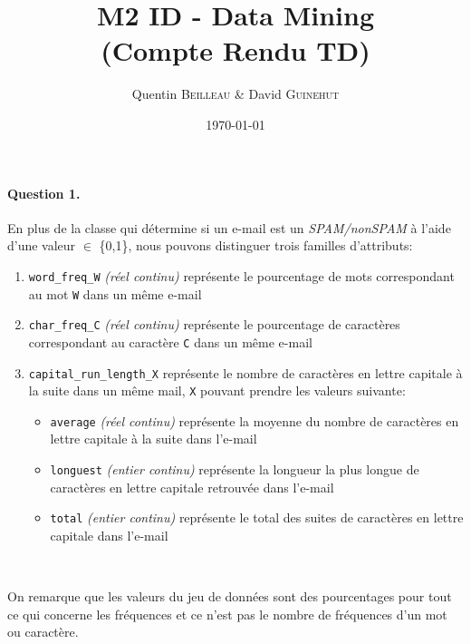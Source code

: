 \documentclass[a4paper,11pt]{article}
\title{M2 ID - Data Mining \\ \normalsize (Compte Rendu TD)}
\author{Quentin \textsc{Beilleau} \& David \textsc{Guinehut}}
\date{\today}
\begin{document}
	\renewcommand{\headrulewidth}{0.001pt}
	
	\pagestyle{fancy}
	
	\maketitle


\paragraph{Question 1.} En plus de la classe qui détermine si un e-mail est un \emph{SPAM/nonSPAM} à l'aide d'une valeur $\in$ \{0,1\}, nous pouvons distinguer trois familles d'attributs:

\begin{enumerate}
	\item \texttt{word\_freq\_W} \emph{(réel continu)} représente le pourcentage de mots correspondant au mot \texttt{W} dans un même e-mail
	\item \texttt{char\_freq\_C} \emph{(réel continu)} représente le pourcentage de caractères correspondant au caractère \texttt{C} dans un même e-mail
	\item \texttt{capital\_run\_length\_X} représente le nombre de caractères en lettre capitale à la suite dans un même mail, \texttt{X} pouvant prendre les valeurs suivante:
	\begin{itemize}
		\item \texttt{average} \emph{(réel continu)} représente la moyenne du nombre de caractères en lettre capitale à la suite dans l'e-mail
		\item \texttt{longuest} \emph{(entier continu)} représente la longueur la plus longue de caractères en lettre capitale retrouvée dans l'e-mail
		\item \texttt{total} \emph{(entier continu)} représente le total des suites de caractères en lettre capitale dans l'e-mail
	\end{itemize}
	~
\end{enumerate}

	On remarque que les valeurs du jeu de données sont des pourcentages pour tout ce qui concerne les fréquences et ce n'est pas le nombre de fréquences d'un mot ou caractère.
\end{document}
